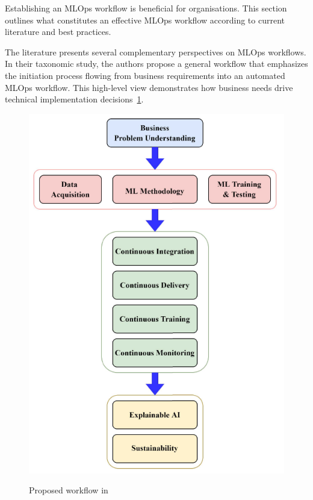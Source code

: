 Establishing an MLOps workflow is beneficial for organisations.
This section outlines what constitutes an effective MLOps workflow according to current literature and best practices.

The literature presents several complementary perspectives on MLOps workflows\cite{treveil2020introducing,gift2021practical,Kreuzberger2022MachineLO}.
In their taxonomic study\cite{9792270}, the authors propose a general workflow that emphasizes the initiation process flowing from business requirements into an automated MLOps workflow.
This high-level view demonstrates how business needs drive technical implementation decisions~\ref{fig:taxo-workflow}.

\begin{figure}[!htbp]
    \caption{Proposed workflow in\cite{9792270}}
    \centering
    \includegraphics[scale=0.3]{images/taxo-workflow}
    \label{fig:taxo-workflow}
\end{figure}

